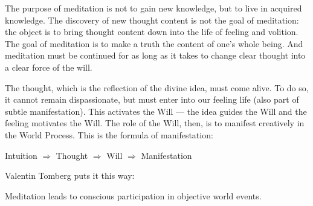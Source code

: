 \begin{quotex}
The purpose of meditation is not to gain new knowledge, but to live in acquired knowledge. The discovery of new thought
content is not the goal of meditation: the object is to bring thought content down into the life of feeling and
volition. The goal of meditation is to make a truth the content of one's whole being. And
meditation must be continued for as long as it takes to change clear thought into a clear force of the will.

\end{quotex}
The thought, which is the reflection of the divine idea, must come alive. To do so, it cannot remain dispassionate, but
must enter into our feeling life (also part of subtle manifestation). This activates the Will —
the idea guides the Will and the feeling motivates the Will. The role of the Will, then, is to manifest creatively in
the World Process. This is the formula of manifestation:

Intuition $\Rightarrow $ Thought $\Rightarrow $ Will $\Rightarrow $ Manifestation

Valentin Tomberg puts it this way:

\begin{quotex}
Meditation leads to conscious participation in objective world events.

\end{quotex}


